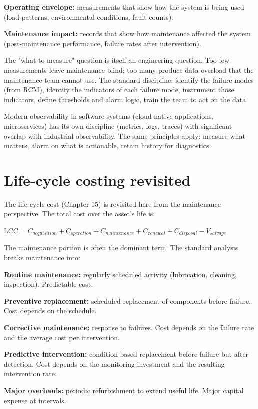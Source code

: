 \textbf{Operating envelope:} measurements that show how the system is being used (load patterns, environmental conditions, fault counts).

\textbf{Maintenance impact:} records that show how maintenance affected the system (post-maintenance performance, failure rates after intervention).

The "what to measure" question is itself an engineering question. Too few measurements leave maintenance blind; too many produce data overload that the maintenance team cannot use. The standard discipline: identify the failure modes (from RCM), identify the indicators of each failure mode, instrument those indicators, define thresholds and alarm logic, train the team to act on the data.

Modern observability in software systems (cloud-native applications, microservices) has its own discipline (metrics, logs, traces) with significant overlap with industrial observability. The same principles apply: measure what matters, alarm on what is actionable, retain history for diagnostics.

\section{Life-cycle costing revisited}

The life-cycle cost (Chapter 15) is revisited here from the maintenance perspective. The total cost over the asset's life is:

$\text{LCC} = C_{acquisition} + C_{operation} + C_{maintenance} + C_{renewal} + C_{disposal} - V_{salvage}$

The maintenance portion is often the dominant term. The standard analysis breaks maintenance into:

\textbf{Routine maintenance:} regularly scheduled activity (lubrication, cleaning, inspection). Predictable cost.

\textbf{Preventive replacement:} scheduled replacement of components before failure. Cost depends on the schedule.

\textbf{Corrective maintenance:} response to failures. Cost depends on the failure rate and the average cost per intervention.

\textbf{Predictive intervention:} condition-based replacement before failure but after detection. Cost depends on the monitoring investment and the resulting intervention rate.

\textbf{Major overhauls:} periodic refurbishment to extend useful life. Major capital expense at intervals.

